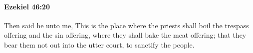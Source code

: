 
		\paragraph{Ezekiel 46:20} %
			\label{EZEKIEL-46-20}

			Then said he unto me, This is the place where the priests shall boil the trespass offering and the sin offering, where they shall bake the meat offering; that they bear them not out into the utter court, to sanctify the people.


